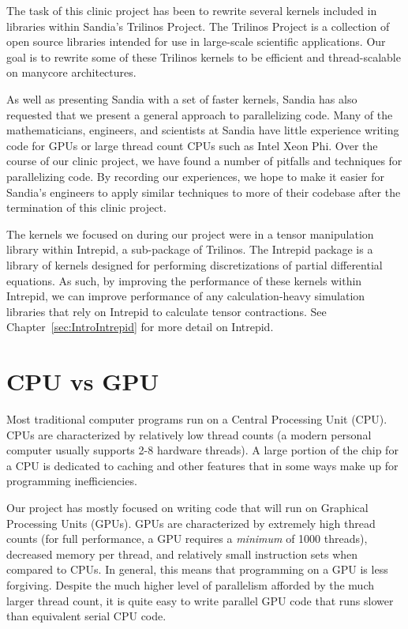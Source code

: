 The task of this clinic project has been to rewrite several kernels included in
libraries within Sandia's Trilinos Project.  The Trilinos Project is a
collection of open source libraries intended for use in large-scale scientific
applications. Our goal is to rewrite some of these Trilinos kernels to be
efficient and thread-scalable on manycore architectures.

As well as presenting Sandia with a set of faster kernels, Sandia has also
requested that we present a general approach to parallelizing code. Many of the
mathematicians, engineers, and scientists at Sandia have little experience
writing code for GPUs or large thread count CPUs such as Intel Xeon Phi.  Over
the course of our clinic project, we have found a number of pitfalls and
techniques for parallelizing code.  By recording our experiences, we hope to
make it easier for Sandia's engineers to apply similar techniques to more of
their codebase after the termination of this clinic project.

The kernels we focused on during our project were in a tensor manipulation
library within Intrepid, a sub-package of Trilinos.  The Intrepid package is a
library of kernels designed for performing discretizations of partial
differential equations.  As such, by improving the performance of these kernels
within Intrepid, we can improve performance of any calculation-heavy simulation
libraries that rely on Intrepid to calculate tensor contractions.  See
Chapter~\ref{sec:IntroIntrepid} for more detail on Intrepid.

\section{CPU vs GPU} \label{CPU-GPU}

Most traditional computer programs run on a Central Processing Unit (CPU). CPUs
are characterized by relatively low thread counts (a modern personal computer
usually supports 2-8 hardware threads). A large portion of the chip for a CPU is
dedicated to caching and other features that in some ways make up for
programming inefficiencies.

Our project has mostly focused on writing code that will run on Graphical
Processing Units (GPUs).  GPUs are characterized by extremely high thread counts
(for full performance, a GPU requires a \emph{minimum} of 1000 threads),
decreased memory per thread, and relatively small instruction sets when compared
to CPUs. In general, this means that programming on a GPU is less forgiving.
Despite the much higher level of parallelism afforded by the much larger thread
count, it is quite easy to write parallel GPU code that runs slower than
equivalent serial CPU code.

